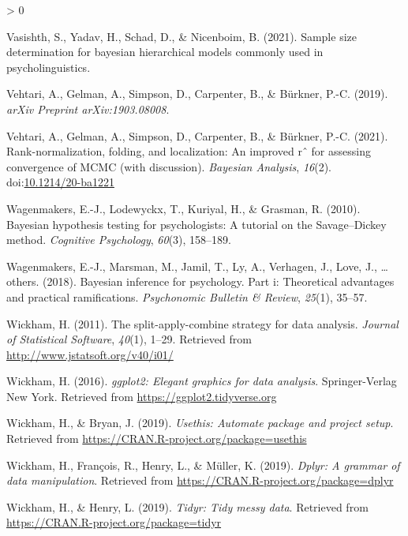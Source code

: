 \documentclass[
  english,
  doc,floatsintext]{apa6}
\newlength{\cslhangindent}
\newenvironment{CSLReferences}[2] %
 {%
  \setlength{\parindent}{0pt}
  \ifodd #1 \everypar{\setlength{\hangindent}{\cslhangindent}}\ignorespaces\fi
  \ifnum #2 > 0
  \setlength{\parskip}{#2\baselineskip}
  \fi
 }%
 {}
\begin{document}
\begin{CSLReferences}{1}{0}
\leavevmode\hypertarget{ref-vasishth2021sample}{}%
Vasishth, S., Yadav, H., Schad, D., \& Nicenboim, B. (2021). Sample size determination for bayesian hierarchical models commonly used in psycholinguistics.

\leavevmode\hypertarget{ref-vehtari2019rank}{}%
Vehtari, A., Gelman, A., Simpson, D., Carpenter, B., \& Bürkner, P.-C. (2019). \emph{arXiv Preprint arXiv:1903.08008}.

\leavevmode\hypertarget{ref-Vehtari_2021}{}%
Vehtari, A., Gelman, A., Simpson, D., Carpenter, B., \& Bürkner, P.-C. (2021). Rank-normalization, folding, and localization: An improved rˆ for assessing convergence of MCMC (with discussion). \emph{Bayesian Analysis}, \emph{16}(2). doi:\href{https://doi.org/10.1214/20-ba1221}{10.1214/20-ba1221}

\leavevmode\hypertarget{ref-wagenmakers2010bayesian}{}%
Wagenmakers, E.-J., Lodewyckx, T., Kuriyal, H., \& Grasman, R. (2010). Bayesian hypothesis testing for psychologists: A tutorial on the {Savage--Dickey} method. \emph{Cognitive Psychology}, \emph{60}(3), 158--189.

\leavevmode\hypertarget{ref-wagenmakers2018bayesian}{}%
Wagenmakers, E.-J., Marsman, M., Jamil, T., Ly, A., Verhagen, J., Love, J., \ldots{} others. (2018). Bayesian inference for psychology. Part i: Theoretical advantages and practical ramifications. \emph{Psychonomic Bulletin \& Review}, \emph{25}(1), 35--57.

\leavevmode\hypertarget{ref-R-plyr}{}%
Wickham, H. (2011). The split-apply-combine strategy for data analysis. \emph{Journal of Statistical Software}, \emph{40}(1), 1--29. Retrieved from \url{http://www.jstatsoft.org/v40/i01/}

\leavevmode\hypertarget{ref-R-ggplot2}{}%
Wickham, H. (2016). \emph{ggplot2: Elegant graphics for data analysis}. Springer-Verlag New York. Retrieved from \url{https://ggplot2.tidyverse.org}

\leavevmode\hypertarget{ref-R-usethis}{}%
Wickham, H., \& Bryan, J. (2019). \emph{Usethis: Automate package and project setup}. Retrieved from \url{https://CRAN.R-project.org/package=usethis}

\leavevmode\hypertarget{ref-R-dplyr}{}%
Wickham, H., François, R., Henry, L., \& Müller, K. (2019). \emph{Dplyr: A grammar of data manipulation}. Retrieved from \url{https://CRAN.R-project.org/package=dplyr}

\leavevmode\hypertarget{ref-R-tidyr}{}%
Wickham, H., \& Henry, L. (2019). \emph{Tidyr: Tidy messy data}. Retrieved from \url{https://CRAN.R-project.org/package=tidyr}


\end{CSLReferences}
\end{document}

